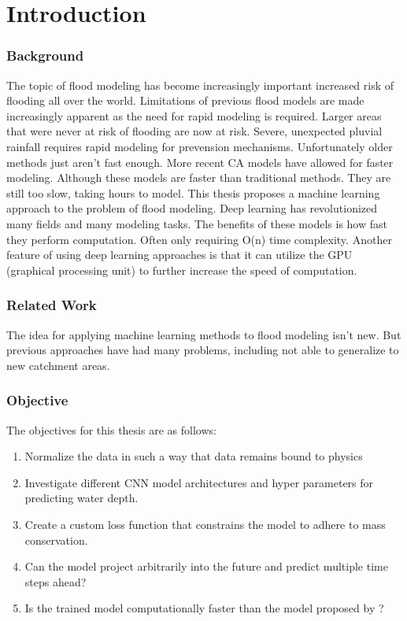 
\chapter{Introduction} %
\label{Chapter1} %

\subsection{Background}
The topic of flood modeling has become increasingly important increased risk of flooding all over the world. Limitations of previous flood models are made increasingly apparent as the need for rapid modeling is required. Larger areas that were never at risk of flooding are now at risk. Severe, unexpected pluvial rainfall requires rapid modeling for prevension mechanisms. Unfortunately older methods just aren't fast enough. More recent CA models have allowed for faster modeling. Although these models are faster than traditional methods. They are still too slow, taking hours to model. This thesis proposes a machine learning approach to the problem of flood modeling. Deep learning has revolutionized many fields and many modeling tasks. The benefits of these models is how fast they perform computation. Often only requiring O(n) time complexity. Another feature of using deep learning approaches is that it can utilize the GPU (graphical processing unit) to further increase the speed of computation.
\subsection{Related Work}
The idea for applying machine learning methods to flood modeling isn't new. But previous approaches have had many problems, including not able to generalize to new catchment areas. 
\subsection{Objective}
The objectives for this thesis are as follows:

\begin{enumerate}
	\item Normalize the data in such a way that data remains bound to physics \label{question1}
	\item Investigate different CNN model architectures and hyper parameters for predicting water depth. \label{qustion2} 
	\item Create a custom loss function that constrains the model to adhere to mass conservation. \label{question3}
	\item Can the model project arbitrarily into the future and predict multiple time steps ahead? \label{question4}
	\item Is the trained model computationally faster than the model proposed by \cite{Ghimire}? \label{question5}
\end{enumerate}